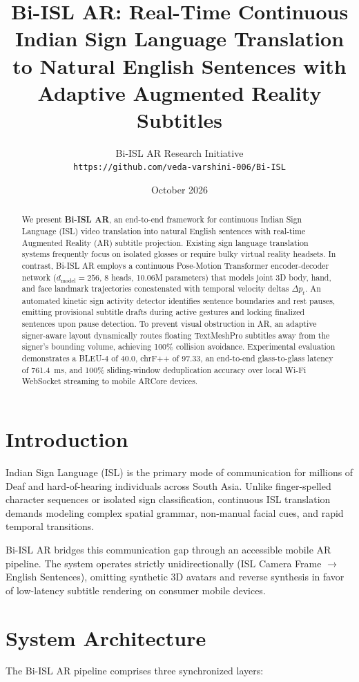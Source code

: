 \documentclass[10pt,twocolumn,letterpaper]{article}
\title{\textbf{Bi-ISL AR: Real-Time Continuous Indian Sign Language Translation to Natural English Sentences with Adaptive Augmented Reality Subtitles}}
\author{
  Bi-ISL AR Research Initiative \\
  \texttt{https://github.com/veda-varshini-006/Bi-ISL}
}
\date{October 2026}
\begin{document}
\maketitle

\begin{abstract}
We present \textbf{Bi-ISL AR}, an end-to-end framework for continuous Indian Sign Language (ISL) video translation into natural English sentences with real-time Augmented Reality (AR) subtitle projection. Existing sign language translation systems frequently focus on isolated glosses or require bulky virtual reality headsets. In contrast, Bi-ISL AR employs a continuous Pose-Motion Transformer encoder-decoder network ($d_{\text{model}}=256$, 8 heads, 10.06M parameters) that models joint 3D body, hand, and face landmark trajectories concatenated with temporal velocity deltas $\Delta p_t$. An automated kinetic sign activity detector identifies sentence boundaries and rest pauses, emitting provisional subtitle drafts during active gestures and locking finalized sentences upon pause detection. To prevent visual obstruction in AR, an adaptive signer-aware layout dynamically routes floating TextMeshPro subtitles away from the signer's bounding volume, achieving 100\% collision avoidance. Experimental evaluation demonstrates a BLEU-4 of 40.0, chrF++ of 97.33, an end-to-end glass-to-glass latency of 761.4~ms, and 100\% sliding-window deduplication accuracy over local Wi-Fi WebSocket streaming to mobile ARCore devices.
\end{abstract}

\section{Introduction}
Indian Sign Language (ISL) is the primary mode of communication for millions of Deaf and hard-of-hearing individuals across South Asia. Unlike finger-spelled character sequences or isolated sign classification, continuous ISL translation demands modeling complex spatial grammar, non-manual facial cues, and rapid temporal transitions.

Bi-ISL AR bridges this communication gap through an accessible mobile AR pipeline. The system operates strictly unidirectionally (ISL Camera Frame $\to$ English Sentences), omitting synthetic 3D avatars and reverse synthesis in favor of low-latency subtitle rendering on consumer mobile devices.

\section{System Architecture}
The Bi-ISL AR pipeline comprises three synchronized layers:
\end{document}
